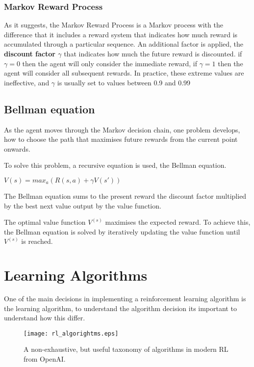  \subsubsection*{Markov Reward Process}
 As it suggests, the Markov Reward Process is a Markov process with the difference that it includes a reward system that indicates how much reward is accumulated through a particular sequence.
 An additional factor is applied, the \textbf{discount factor $\gamma$} that indicates how much the future reward is discounted. if $\gamma = 0$ 
 then the agent will only consider the immediate reward, if $\gamma = 1$ then the agent will consider all subsequent rewards. 
 In practice, these extreme values are ineffective, and $\gamma$ is usually set to values between 0.9 and 0.99

 \subsection{Bellman equation}
 As the agent moves through the Markov decision chain, one problem develops, how to choose the path that maximises future rewards from the current point onwards. 
 
 To solve this problem, a recursive equation is used, the Bellman equation.
 
 $V(s) = max_a (R(s,a)+\gamma V(s')) $ 
 
 The Bellman equation sums to the present reward the discount factor multiplied by the best next value output by the value function.

 The optimal value function $V^(s)$ maximises the expected reward. To achieve this, the Bellman equation is solved by iteratively updating the value function until $V^(s)$ is reached.


\section{Learning Algorithms}
One of the main decisions in implementing a reinforcement learning algorithm is the learning algorithm, to understand the algorithm decision its important to understand how this differ.
\begin{figure}[H]
\centering
\texttt{[image: rl\_algorightms.eps]}
\caption{A non-exhaustive, but useful taxonomy of algorithms in modern RL from OpenAI\cite{openai_rl}.}
\label{fig:rl_algorightms}
\end{figure}


